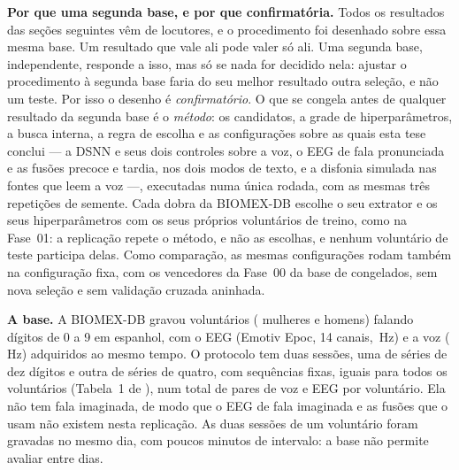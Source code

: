 		\par \textbf{Por que uma segunda base, e por que confirmatória.} Todos os resultados das seções seguintes vêm de  locutores, e o procedimento foi desenhado sobre essa mesma base. Um resultado que vale ali pode valer só ali. Uma segunda base, independente, responde a isso, mas só se nada for decidido nela: ajustar o procedimento à segunda base faria do seu melhor resultado outra seleção, e não um teste. Por isso o desenho é \emph{confirmatório}. O que se congela antes de qualquer resultado da segunda base é o \emph{método}: os candidatos, a grade de hiperparâmetros, a busca interna, a regra de escolha e as configurações sobre as quais esta tese conclui --- a \ac{DSNN} e seus dois controles sobre a voz, o \ac{EEG} de fala pronunciada e as fusões precoce e tardia, nos dois modos de texto, e a disfonia simulada nas fontes que leem a voz ---, executadas numa única rodada, com as mesmas três repetições de semente. Cada dobra da BIOMEX-DB escolhe o seu extrator e os seus hiperparâmetros com os seus próprios voluntários de treino, como na Fase~01: a replicação repete o método, e não as escolhas, e nenhum voluntário de teste participa delas. Como comparação, as mesmas configurações rodam também na configuração fixa, com os vencedores da Fase~00 da base de  congelados, sem nova seleção e sem validação cruzada aninhada.

		\par \textbf{A base.} A BIOMEX-DB \cite{morenorodriguez2021biomex,morenorodriguez2021biomexdata} gravou  voluntários ( mulheres e  homens) falando dígitos de 0 a 9 em espanhol, com o \ac{EEG} (Emotiv Epoc, 14 canais, \,Hz) e a voz (\,Hz) adquiridos ao mesmo tempo. O protocolo tem duas sessões, uma de séries de dez dígitos e outra de séries de quatro, com sequências fixas, iguais para todos os voluntários (Tabela~1 de ), num total de  pares de voz e \ac{EEG} por voluntário. Ela não tem fala imaginada, de modo que o \ac{EEG} de fala imaginada e as fusões que o usam não existem nesta replicação. As duas sessões de um voluntário foram gravadas no mesmo dia, com poucos minutos de intervalo: a base não permite avaliar entre dias.

